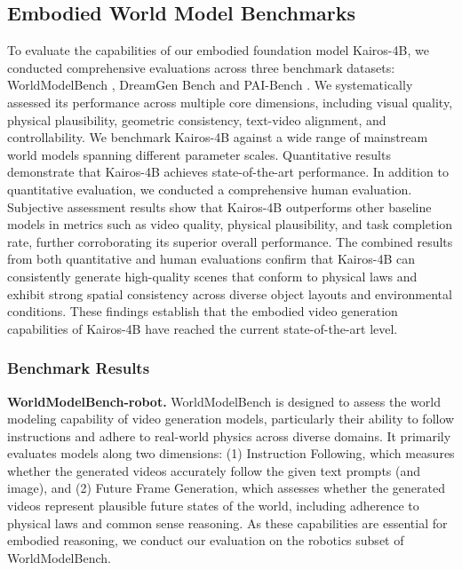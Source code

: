 \documentclass{llmxive}
\begin{document}
\subsection{Embodied World Model Benchmarks}
To evaluate the capabilities of our embodied foundation model Kairos-4B, we conducted comprehensive evaluations across three benchmark datasets: WorldModelBench \cite{li2025worldmodelbench}, DreamGen Bench \cite{fan2025dreamgen} and PAI-Bench \cite{zhou2025pai}. We systematically assessed its performance across multiple core dimensions, including visual quality, physical plausibility, geometric consistency, text-video alignment, and controllability. We benchmark Kairos-4B against a wide range of mainstream world models spanning different parameter scales. Quantitative results demonstrate that Kairos-4B achieves state-of-the-art performance.
In addition to quantitative evaluation, we conducted a comprehensive human evaluation. Subjective assessment results show that Kairos-4B outperforms other baseline models in metrics such as video quality, physical plausibility, and task completion rate, further corroborating its superior overall performance.
The combined results from both quantitative and human evaluations confirm that Kairos-4B can consistently generate high-quality scenes that conform to physical laws and exhibit strong spatial consistency across diverse object layouts and environmental conditions. These findings establish that the embodied video generation capabilities of Kairos-4B have reached the current state-of-the-art level.


\subsubsection{Benchmark Results}

\textbf{WorldModelBench-robot.}  
WorldModelBench \cite{li2025worldmodelbench} is designed to assess the world modeling capability of video generation models, particularly their ability to follow instructions and adhere to real-world physics across diverse domains. It primarily evaluates models along two dimensions: (1) Instruction Following, which measures whether the generated videos accurately follow the given text prompts (and image), and (2) Future Frame Generation, which assesses whether the generated videos represent plausible future states of the world, including adherence to physical laws and common sense reasoning. As these capabilities are essential for embodied reasoning, we conduct our evaluation on the robotics subset of WorldModelBench.
\end{document}
